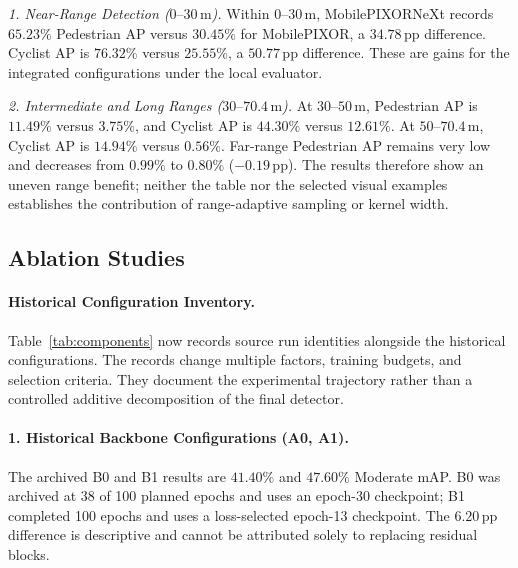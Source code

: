 



\textit{1. Near-Range Detection ($0\text{--}30\,\text{m}$).}
Within $0\text{--}30\,\text{m}$, MobilePIXORNeXt records $65.23\%$ Pedestrian AP versus $30.45\%$ for MobilePIXOR, a $34.78\,\text{pp}$ difference. Cyclist AP is $76.32\%$ versus $25.55\%$, a $50.77\,\text{pp}$ difference. These are gains for the integrated configurations under the local evaluator.

\textit{2. Intermediate and Long Ranges ($30\text{--}70.4\,\text{m}$).}
At $30\text{--}50\,\text{m}$, Pedestrian AP is $11.49\%$ versus $3.75\%$, and Cyclist AP is $44.30\%$ versus $12.61\%$. At $50\text{--}70.4\,\text{m}$, Cyclist AP is $14.94\%$ versus $0.56\%$. Far-range Pedestrian AP remains very low and decreases from $0.99\%$ to $0.80\%$ ($-0.19\,\text{pp}$). The results therefore show an uneven range benefit; neither the table nor the selected visual examples establishes the contribution of range-adaptive sampling or kernel width.



\subsection{Ablation Studies}
\label{sec:ablations}

\paragraph{Historical Configuration Inventory.}
Table~\ref{tab:components} now records source run identities alongside the historical configurations. The records change multiple factors, training budgets, and selection criteria. They document the experimental trajectory rather than a controlled additive decomposition of the final detector.

\paragraph{1. Historical Backbone Configurations (A0, A1).}
The archived B0 and B1 results are $41.40\%$ and $47.60\%$ Moderate mAP. B0 was archived at 38 of 100 planned epochs and uses an epoch-30 checkpoint; B1 completed 100 epochs and uses a loss-selected epoch-13 checkpoint. The $6.20\,\text{pp}$ difference is descriptive and cannot be attributed solely to replacing residual blocks.

